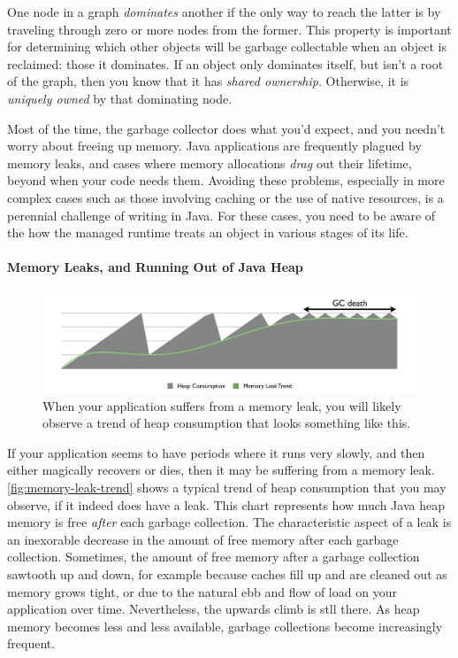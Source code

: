  {
\label{sec:dominance} One node in a graph \emph{dominates}
another if the only way to reach the latter is by traveling through zero or more
nodes from the former.
This property is important for determining which other objects will be garbage
collectable when an object is reclaimed: those it dominates. If an object only
dominates itself, but isn't a root of the graph, then you know that it has
\emph{shared ownership}. Otherwise, it is
\emph{uniquely owned} by that dominating node.}

Most of the time, the garbage collector does what you'd expect, and you needn't
worry about freeing up memory. Java applications are frequently plagued by
memory leaks, and cases where memory allocations \emph{drag} out their lifetime,
beyond when your code needs them. Avoiding these problems, especially in more
complex cases such as those involving caching or the use of native resources, is
a perennial challenge of writing in Java. For these cases, you need to be aware
of the how the managed runtime treats an object in various stages of its life.

\paragraph{Memory Leaks, and Running Out of Java Heap}
\label{sec:memory-leaks}

\begin{figure}
\centering
	\includegraphics[width=\textwidth]{part2/Figures/fundamentals/leaktrend}
	\caption{When your application suffers from a memory leak, you will likely
	observe a trend of heap consumption that looks something like this.
	}
	\label{fig:memory-leak-trend}
\end{figure}

If your application seems to have periods where it runs very slowly, and then
either magically recovers or dies, then it may be suffering from a memory leak.
\autoref{fig:memory-leak-trend} shows a typical trend of heap consumption that
you may observe, if it indeed does have a leak. This chart represents how much
Java heap memory is free \emph{after} each garbage collection. The
characteristic aspect of a leak is an inexorable decrease in the amount of free
memory after each garbage collection. Sometimes, the amount of free memory after
a garbage collection sawtooth up and down, for example because caches fill up
and are cleaned out as memory grows tight, or due to the natural ebb and flow of
load on your application over time. Nevertheless, the upwards climb is stll
there. As heap memory becomes less and less available, garbage collections
become increasingly frequent.


